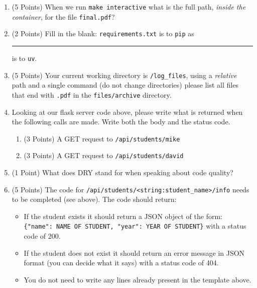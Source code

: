 \documentclass[11pt]{article}
\begin{document}
\begin{enumerate}
\begin{enumerate}
\end{enumerate}

\item (5 Points) When we run \texttt{make interactive} what is the full path, \emph{inside the container}, for the file \texttt{final.pdf}?

\vspace{2cm}

\item (2 Points) Fill in the blank: \texttt{requirements.txt} is to \texttt{pip} as \rule{3cm}{0.15mm} is to \texttt{uv}.


\vspace{1cm}

\item (5 Points) Your current working directory is \texttt{/log\_files}, using a \emph{relative} path and a single command (do not change directories) please list all files that end with \texttt{.pdf} in the \texttt{files/archive} directory.

\vspace{5cm}



\item Looking at our flask server code above, please write what is returned when the following calls are made. Write both the body and the status code.


\begin{enumerate}
\item (3 Points) A GET request to \texttt{/api/students/mike}
\vspace{4cm}
\item (3 Points) A GET request to \texttt{/api/students/david}
\vspace{4cm}
\end{enumerate}



\item (1 Point) What does DRY stand for when speaking about code quality?

\newpage 


\item (5 Points) The code for \texttt{/api/students/<string:student\_name>/info} needs to be completed (see above). The code should return:
\begin{itemize}
	\item If the student exists it should return a JSON object of the form: \\ \texttt{\{"name": NAME OF STUDENT, "year": YEAR OF STUDENT\}} with a status code of 200.
	\item If the student does not exist it should return an error message in JSON format (you can decide what it says) with a status code of 404.
	\item You do not need to write any lines already present in the template above.
\end{itemize}



\end{enumerate}
\end{document}
